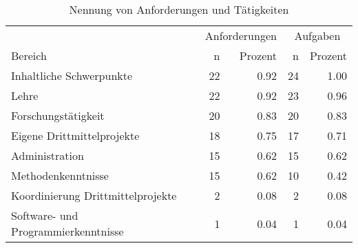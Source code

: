 \documentclass[
]{article}
\begin{document}
\begin{table}[H]

\caption{\label{tab:proftasks}Nennung von Anforderungen und Tätigkeiten}
\centering
\begin{tabular}[t]{l|r|r|r|r}
\hline
\multicolumn{1}{c|}{ } & \multicolumn{2}{c|}{Anforderungen} & \multicolumn{2}{c}{Aufgaben} \\
\cline{2-3} \cline{4-5}
Bereich & n & Prozent & n  & Prozent \\
\hline
Inhaltliche Schwerpunkte & 22 & 0.92 & 24 & 1.00\\
\hline
Lehre & 22 & 0.92 & 23 & 0.96\\
\hline
Forschungstätigkeit & 20 & 0.83 & 20 & 0.83\\
\hline
Eigene Drittmittelprojekte & 18 & 0.75 & 17 & 0.71\\
\hline
Administration & 15 & 0.62 & 15 & 0.62\\
\hline
Methodenkenntnisse & 15 & 0.62 & 10 & 0.42\\
\hline
Koordinierung Drittmittelprojekte & 2 & 0.08 & 2 & 0.08\\
\hline
Software- und Programmierkenntnisse & 1 & 0.04 & 1 & 0.04\\
\hline
\end{tabular}
\end{table}

  
\end{document}
